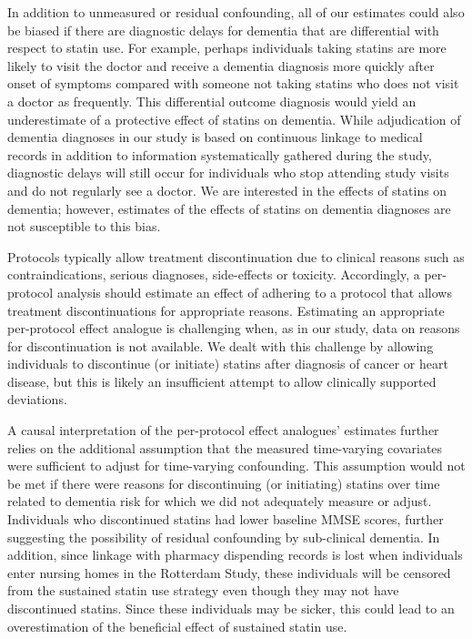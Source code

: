 \documentclass[
]{book}
\begin{document}
In addition to unmeasured or residual confounding, all of our estimates could also be biased if there are diagnostic delays for dementia that are differential with respect to statin use. For example, perhaps individuals taking statins are more likely to visit the doctor and receive a dementia diagnosis more quickly after onset of symptoms compared with someone not taking statins who does not visit a doctor as frequently. This differential outcome diagnosis would yield an underestimate of a protective effect of statins on dementia. While adjudication of dementia diagnoses in our study is based on continuous linkage to medical records in addition to information systematically gathered during the study, diagnostic delays will still occur for individuals who stop attending study visits and do not regularly see a doctor. We are interested in the effects of statins on dementia; however, estimates of the effects of statins on dementia diagnoses are not susceptible to this bias.

Protocols typically allow treatment discontinuation due to clinical reasons such as
contraindications, serious diagnoses, side-effects or toxicity. Accordingly, a per-protocol analysis should estimate an effect of adhering to a protocol that allows treatment discontinuations for appropriate reasons. Estimating an appropriate per-protocol effect analogue is challenging when, as in our study, data on reasons for discontinuation is not available. We dealt with this challenge by allowing individuals to discontinue (or initiate) statins after diagnosis of cancer or heart disease, but this is likely an insufficient attempt to allow clinically supported deviations.

A causal interpretation of the per-protocol effect analogues' estimates further relies on the additional assumption that the measured time-varying covariates were sufficient to adjust for time-varying confounding. This assumption would not be met if there were reasons for discontinuing (or initiating) statins over time related to dementia risk for which we did not adequately measure or adjust. Individuals who discontinued statins had lower baseline MMSE scores, further suggesting the possibility of residual confounding by sub-clinical dementia. In addition, since linkage with pharmacy dispending records is lost when individuals enter nursing homes in the Rotterdam Study, these individuals will be censored from the sustained statin use strategy even though they may not have discontinued statins. Since these individuals may be sicker, this could lead to an overestimation of the beneficial effect of sustained statin use.
\end{document}
